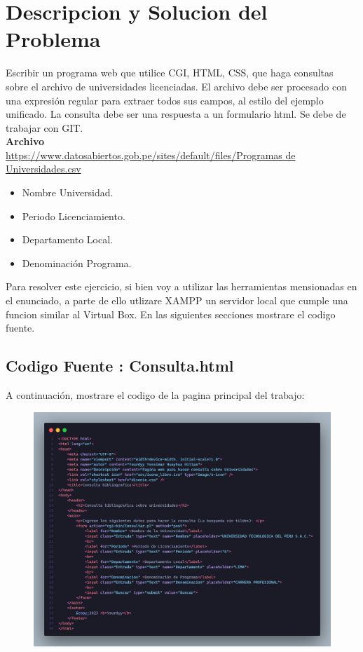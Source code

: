 \section{Descripcion y Solucion del Problema}
Escribir un programa web que utilice CGI, HTML, CSS, que haga consultas sobre el archivo de universidades licenciadas.  
El archivo debe ser procesado con una expresión regular para extraer todos sus campos, al estilo del ejemplo unificado.
La consulta debe ser una respuesta a un formulario html.  Se debe de trabajar con GIT.\\

\textbf{Archivo} \\
\url{https://www.datosabiertos.gob.pe/sites/default/files/Programas de Universidades.csv}

\begin{itemize}
    \item Nombre Universidad.
    \item Periodo Licenciamiento.
    \item Departamento Local.
    \item Denominación Programa.
\end{itemize}

Para resolver este ejercicio, si bien voy a utilizar las herramientas mensionadas en el enunciado, a parte de ello utlizare
XAMPP un servidor local que cumple una funcion similar al Virtual Box. En las siguientes secciones mostrare el codigo fuente. 
\clearpage

\subsection{Codigo Fuente : Consulta.html}
A continuación, mostrare el codigo de la pagina principal del trabajo: \\
\begin{figure}[h!]
    \centering
    \includegraphics[width=1.0\textwidth,keepaspectratio]{img/Consulta_html.png}
\end{figure}\\

